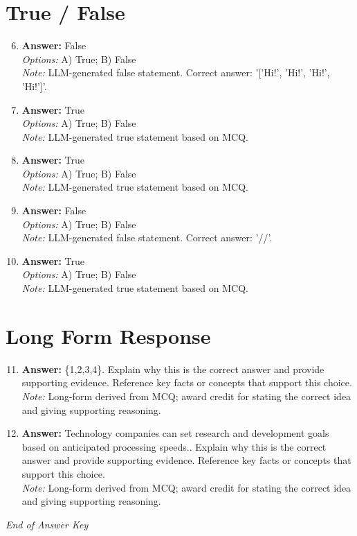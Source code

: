 \documentclass[12pt]{article}
\begin{document}
\section*{True / False}
\begin{enumerate}[label=\arabic*.]
\setcounter{enumi}{5}
\item \textbf{Answer:} False
\\ \textit{Options:} A) True; B) False
\\ \textit{Note:} LLM-generated false statement. Correct answer: '['Hi!', 'Hi!', 'Hi!', 'Hi!']'.
\item \textbf{Answer:} True
\\ \textit{Options:} A) True; B) False
\\ \textit{Note:} LLM-generated true statement based on MCQ.
\item \textbf{Answer:} True
\\ \textit{Options:} A) True; B) False
\\ \textit{Note:} LLM-generated true statement based on MCQ.
\item \textbf{Answer:} False
\\ \textit{Options:} A) True; B) False
\\ \textit{Note:} LLM-generated false statement. Correct answer: '//'.
\item \textbf{Answer:} True
\\ \textit{Options:} A) True; B) False
\\ \textit{Note:} LLM-generated true statement based on MCQ.
\end{enumerate}

\section*{Long Form Response}
\begin{enumerate}[label=\arabic*.]
\setcounter{enumi}{10}
\item \textbf{Answer:} \{1,2,3,4\}. Explain why this is the correct answer and provide supporting evidence. Reference key facts or concepts that support this choice.
\\ \textit{Note:} Long-form derived from MCQ; award credit for stating the correct idea and giving supporting reasoning.
\item \textbf{Answer:} Technology companies can set research and development goals based on anticipated processing speeds.. Explain why this is the correct answer and provide supporting evidence. Reference key facts or concepts that support this choice.
\\ \textit{Note:} Long-form derived from MCQ; award credit for stating the correct idea and giving supporting reasoning.
\end{enumerate}

\vfill
\noindent\textit{End of Answer Key}
\end{document}
